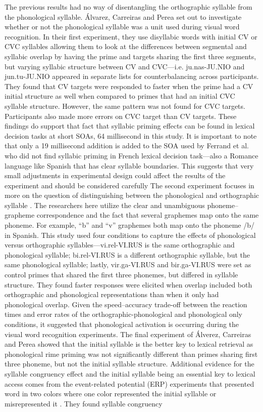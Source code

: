 The previous results had no way of disentangling the orthographic syllable from the phonological syllable. Álvarez, Carreiras and Perea \parencite*{Alvarez2004-nd} set out to investigate whether or not the phonological syllable was a unit used during visual word recognition. In their first experiment, they use disyllabic words with initial CV or CVC syllables allowing them to look at the differences between segmental and syllabic overlap by having the prime and targets sharing the first three segments, but varying syllabic structure between CV and CVC—i.e. ju.nas-JU.NIO and jun.tu-JU.NIO appeared in separate lists for counterbalancing across participants. They found that CV targets were responded to faster when the prime had a CV initial structure as well when compared to primes that had an initial CVC syllable structure. However, the same pattern was not found for CVC targets. Participants also made more errors on CVC target than CV targets. These findings do support that fact that syllabic priming effects can be found in lexical decision tasks at short SOAs, 64 millisecond in this study. It is important to note that only a 19 millisecond addition is added to the SOA used by Ferrand et al. \parencite*{Ferrand1996-vu} who did not find syllabic priming in French lexical decision task—also a Romance language like Spanish that has clear syllable boundaries. This suggests that very small adjustments in experimental design could affect the results of the experiment and should be considered carefully The second experiment focuses in more on the question of distinguishing between the phonological and orthographic syllable \parencite{Alvarez2004-nd}. The researchers here utilize the clear and unambiguous phoneme–grapheme correspondence and the fact that several graphemes map onto the same phoneme. For example, “b” and “v” graphemes both map onto the phoneme /b/ in Spanish. This study used four conditions to capture the effects of phonological versus orthographic syllables—vi.rel-VI.RUS is the same orthographic and phonological syllable; bi.rel-VI.RUS is a different orthographic syllable, but the same phonological syllable; lastly, vir.ga-VI.RUS and bir.ga-VI.RUS were set as control primes that shared the first three phonemes, but differed in syllable structure. They found faster responses were elicited when overlap included both orthographic and phonological representations than when it only had phonological overlap. Given the speed–accuracy trade-off between the reaction times and error rates of the orthographic-phonological and phonological only conditions, it suggested that phonological activation is occurring during the visual word recognition experiments. The final experiment of Álverez, Carreiras and Perea \parencite*{Alvarez2004-nd} showed that the initial syllable is the better key to lexical retrieval as phonological rime priming was not significantly different than primes sharing first three phoneme, but not the initial syllable structure. Additional evidence for the syllable congruency effect and the initial syllable being an essential key to lexical access comes from the event-related potential (ERP) experiments that presented word in two colors where one color represented the initial syllable or misrepresented it \citep{Carreiras2005-us}. They found syllable congruency 